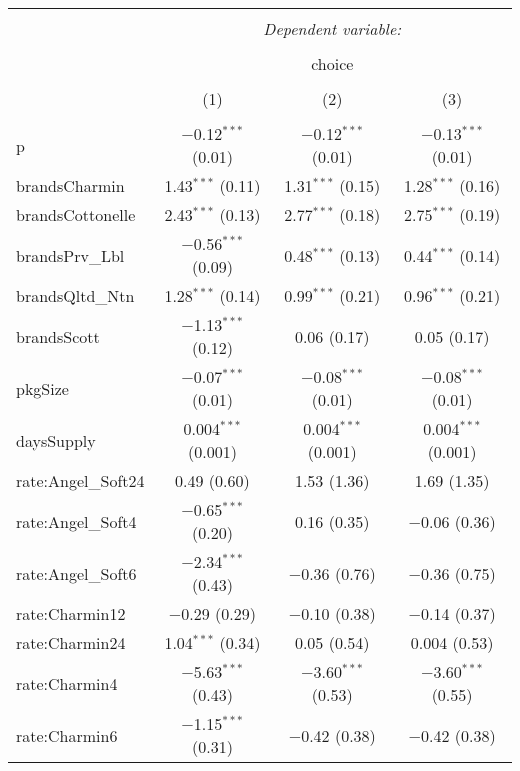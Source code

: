 
\begin{table}[!htbp] \centering 
  \caption{} 
  \label{tab:mnlBostonCond} 
\begin{tabular}{@{\extracolsep{5pt}}lccc} 
\\[-1.8ex]\hline 
\hline \\[-1.8ex] 
 & \multicolumn{3}{c}{\textit{Dependent variable:}} \\ 
\cline{2-4} 
\\[-1.8ex] & \multicolumn{3}{c}{choice} \\ 
\\[-1.8ex] & (1) & (2) & (3)\\ 
\hline \\[-1.8ex] 
 p & $-$0.12$^{***}$ (0.01) & $-$0.12$^{***}$ (0.01) & $-$0.13$^{***}$ (0.01) \\ 
  brandsCharmin & 1.43$^{***}$ (0.11) & 1.31$^{***}$ (0.15) & 1.28$^{***}$ (0.16) \\ 
  brandsCottonelle & 2.43$^{***}$ (0.13) & 2.77$^{***}$ (0.18) & 2.75$^{***}$ (0.19) \\ 
  brandsPrv\_Lbl & $-$0.56$^{***}$ (0.09) & 0.48$^{***}$ (0.13) & 0.44$^{***}$ (0.14) \\ 
  brandsQltd\_Ntn & 1.28$^{***}$ (0.14) & 0.99$^{***}$ (0.21) & 0.96$^{***}$ (0.21) \\ 
  brandsScott & $-$1.13$^{***}$ (0.12) & 0.06 (0.17) & 0.05 (0.17) \\ 
  pkgSize & $-$0.07$^{***}$ (0.01) & $-$0.08$^{***}$ (0.01) & $-$0.08$^{***}$ (0.01) \\ 
  daysSupply & 0.004$^{***}$ (0.001) & 0.004$^{***}$ (0.001) & 0.004$^{***}$ (0.001) \\ 
  rate:Angel\_Soft24 & 0.49 (0.60) & 1.53 (1.36) & 1.69 (1.35) \\ 
  rate:Angel\_Soft4 & $-$0.65$^{***}$ (0.20) & 0.16 (0.35) & $-$0.06 (0.36) \\ 
  rate:Angel\_Soft6 & $-$2.34$^{***}$ (0.43) & $-$0.36 (0.76) & $-$0.36 (0.75) \\ 
  rate:Charmin12 & $-$0.29 (0.29) & $-$0.10 (0.38) & $-$0.14 (0.37) \\ 
  rate:Charmin24 & 1.04$^{***}$ (0.34) & 0.05 (0.54) & 0.004 (0.53) \\ 
  rate:Charmin4 & $-$5.63$^{***}$ (0.43) & $-$3.60$^{***}$ (0.53) & $-$3.60$^{***}$ (0.55) \\ 
  rate:Charmin6 & $-$1.15$^{***}$ (0.31) & $-$0.42 (0.38) & $-$0.42 (0.38) \\ 

\end{tabular}
\end{table}
